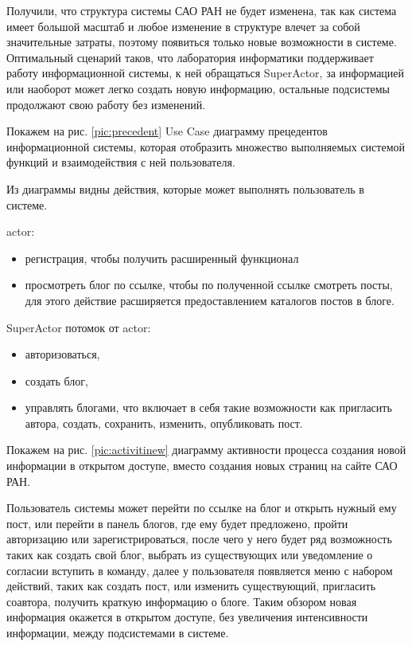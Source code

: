 Получили, что структура системы САО РАН не будет изменена, так как система имеет большой масштаб и любое изменение в структуре влечет за собой значительные затраты, поэтому появиться только новые возможности в системе. Оптимальный сценарий таков, что лаборатория информатики поддерживает работу информационной системы, к ней обращаться SuperActor, за информацией или наоборот может легко создать новую информацию, остальные подсистемы продолжают свою работу без изменений.

Покажем на рис. \ref{pic:precedent} Use Case диаграмму прецедентов информационной системы, которая отобразить множество выполняемых системой функций и взаимодействия с ней пользователя. 
 

Из диаграммы видны действия, которые может выполнять пользователь в системе.

actor:
\begin{itemize}
	\item регистрация, чтобы получить расширенный функционал 
	\item просмотреть блог по ссылке, чтобы по полученной ссылке смотреть посты, для этого действие расширяется предоставлением каталогов постов в блоге.
\end{itemize}

\pagebreak

SuperActor потомок от actor:
\begin{itemize}   
	\item авторизоваться,
	\item создать блог, 
	\item управлять блогами, что включает в себя такие возможности как пригласить автора, создать, сохранить, изменить, опубликовать пост. 
\end{itemize}

\pagebreak
Покажем на рис. \ref{pic:activitinew} диаграмму активности процесса создания новой информации в открытом доступе, вместо создания новых страниц на сайте САО РАН.


Пользователь системы может перейти по ссылке на блог и открыть нужный ему пост, или перейти в панель блогов, где ему будет предложено, пройти авторизацию или зарегистрироваться, после чего у него будет ряд возможность таких как создать свой блог, выбрать из существующих или уведомление о согласии вступить в команду, далее у пользователя появляется меню с набором действий, таких как создать пост, или изменить существующий, пригласить соавтора, получить краткую информацию о блоге. Таким обзором новая информация окажется в открытом доступе, без увеличения интенсивности информации, между подсистемами в системе.

